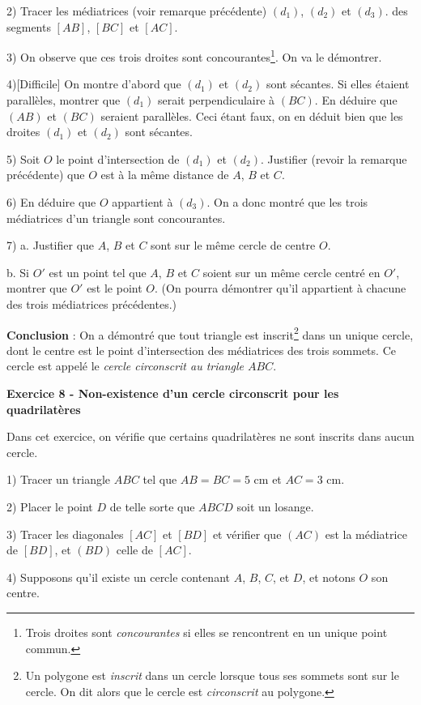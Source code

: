 \documentclass[12 pt]{article}
\theoremstyle{plain}
\newcounter{n}
\numberwithin{n}{section}
\begin{document}
2) Tracer les médiatrices (voir remarque précédente) $(d_1)$, $(d_2)$ et $(d_3)$. des segments $[AB]$, $[BC]$ et $[AC]$. 

3) On observe que ces trois droites sont concourantes\footnote{Trois droites sont \emph{concourantes} si elles se rencontrent en un unique point commun.}. On va le démontrer. 

4)[Difficile] On montre d'abord que $(d_1)$ et $(d_2)$ sont sécantes. Si elles étaient parallèles, montrer que $(d_1)$ serait perpendiculaire à $(BC)$. En déduire que $(AB)$ et $(BC)$ seraient parallèles. Ceci étant faux, on en déduit bien que les droites $(d_1)$ et $(d_2)$ sont sécantes. 

5) Soit $O$ le point d'intersection de $(d_1)$ et $(d_2)$. Justifier (revoir la remarque précédente) que $O$ est à la même distance de $A$, $B$ et $C$. 

6) En déduire que $O$ appartient à $(d_3)$. On a donc montré que les trois médiatrices d'un triangle sont concourantes. 

7) a. Justifier que $A$, $B$ et $C$ sont sur le même cercle de centre $O$. 

b. Si $O'$ est un point tel que $A$, $B$ et $C$ soient sur un même cercle centré en $O'$, montrer que $O'$ est le point $O$. (On pourra démontrer qu'il appartient à chacune des trois médiatrices précédentes.)

\textbf{Conclusion} : On a démontré que tout triangle est inscrit\footnote{Un polygone est \emph{inscrit} dans un cercle lorsque tous ses sommets sont sur le cercle. On dit alors que le cercle est \emph{circonscrit} au polygone.} dans un unique cercle, dont le centre est le point d'intersection des médiatrices des trois sommets. Ce cercle est appelé le \emph{cercle circonscrit au triangle $ABC$}.
\newpage

\textbf{Exercice 8 - Non-existence d'un cercle circonscrit pour les quadrilatères}

Dans cet exercice, on vérifie que certains quadrilatères ne sont inscrits dans aucun cercle. 

1) Tracer un triangle $ABC$ tel que $AB=BC= 5$ cm et $AC= 3$ cm. 

2) Placer le point $D$ de telle sorte que $ABCD$ soit un losange.  

3) Tracer les diagonales $[AC]$ et $[BD]$ et vérifier que $(AC)$ est la médiatrice de $[BD]$, et $(BD)$ 
celle de $[AC]$. 

4) Supposons qu'il existe un cercle contenant $A$, $B$, $C$, et $D$, et notons $O$ son centre. 
\end{document}
